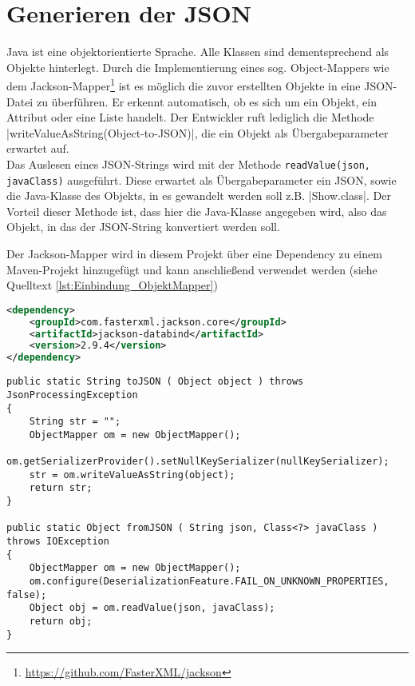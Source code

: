 \section{Generieren der \acf{JSON}}
\label{sec:json_generieren}

Java ist eine objektorientierte Sprache.
Alle Klassen sind dementsprechend als Objekte hinterlegt.
Durch die Implementierung eines sog. Object-Mappers wie dem Jackson-Mapper\footnote{\url{https://github.com/FasterXML/jackson}}
ist es möglich die zuvor erstellten Objekte in eine \acs{JSON}-Datei zu überführen.
Er erkennt automatisch, ob es sich um ein Objekt, ein Attribut oder eine Liste handelt.
Der Entwickler ruft lediglich die Methode \jinline |writeValueAsString(Object-to-JSON)|, die ein Objekt als Übergabeparameter erwartet auf. \\
Das Auslesen eines \acs{JSON}-Strings wird mit der Methode \texttt{readValue(json, javaClass)} ausgeführt.
Diese erwartet als Übergabeparameter ein \acs{JSON}, sowie die Java-Klasse des Objekts, in es gewandelt werden soll z.B. \jinline |Show.class|.
Der Vorteil dieser Methode ist, dass hier die Java-Klasse angegeben wird, also das Objekt, in das der \acs{JSON}-String konvertiert werden soll.

Der Jackson-Mapper wird in diesem Projekt über eine Dependency zu einem Maven-Projekt hinzugefügt und kann anschließend verwendet werden (siehe Quelltext \ref{lst:Einbindung_ObjektMapper}) %

\begin{lstlisting}[language=XML, caption={Einbindung des Objekt-Mappers in die pom.xml}, label={lst:Einbindung_ObjektMapper}]
<dependency>
	<groupId>com.fasterxml.jackson.core</groupId>
	<artifactId>jackson-databind</artifactId>
	<version>2.9.4</version>
</dependency>
\end{lstlisting}

\begin{lstlisting}[style=lstJava, caption={Ausschnitt aus der selbst erstellten Klasse JSONConverter}]
public static String toJSON ( Object object ) throws JsonProcessingException
{
	String str = "";
	ObjectMapper om = new ObjectMapper();
	om.getSerializerProvider().setNullKeySerializer(nullKeySerializer);
	str = om.writeValueAsString(object);
	return str;
}

public static Object fromJSON ( String json, Class<?> javaClass ) throws IOException
{
	ObjectMapper om = new ObjectMapper();
	om.configure(DeserializationFeature.FAIL_ON_UNKNOWN_PROPERTIES, false);
	Object obj = om.readValue(json, javaClass);
	return obj;
}
\end{lstlisting}
